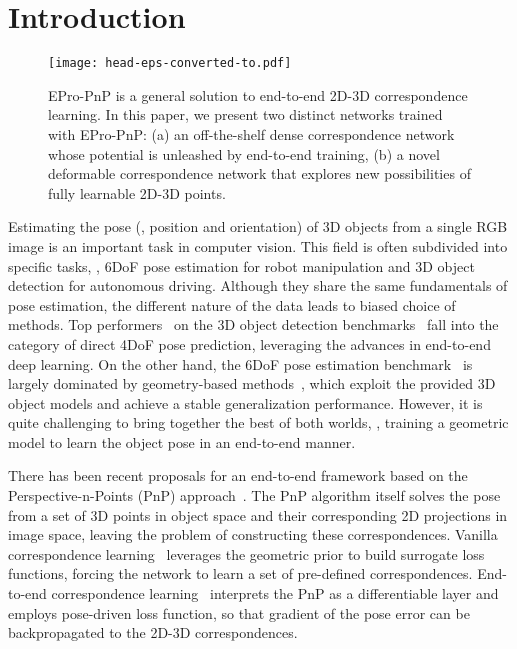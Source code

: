 \documentclass[10pt,twocolumn,letterpaper]{article}
\begin{document}
\section{Introduction}

\begin{figure}[t]
\begin{center}
  \texttt{[image: head-eps-converted-to.pdf]}
\end{center}
\vspace{-0.5ex}
\caption{EPro-PnP is a general solution to end-to-end 2D-3D correspondence learning. In this paper, we present two distinct networks trained with EPro-PnP: (a) an off-the-shelf dense correspondence network whose potential is unleashed by end-to-end training, (b) a novel deformable correspondence network that explores new possibilities of fully learnable 2D-3D points.}
\label{fig:header}
\end{figure}

Estimating the pose (\ie, position and orientation) of 3D objects from a single RGB image is an important task in computer vision.
This field is often subdivided into specific tasks, \eg, 6DoF pose estimation for robot manipulation and 3D object detection for autonomous driving. Although they share the same fundamentals of pose estimation, the different nature of the data leads to biased choice of methods. Top performers~\cite{pgd, dd3d, detr3d} on the 3D object detection benchmarks~\cite{nuscenes,kitti} fall into the category of direct 4DoF pose prediction, leveraging the advances in end-to-end deep learning. On the other hand, the 6DoF pose estimation benchmark~\cite{linemod} is largely dominated by geometry-based methods~\cite{repose, DPOD}, which exploit the provided 3D object models and achieve a stable generalization performance. However, it is quite challenging to bring together the best of both worlds, \ie, training a geometric model to learn the object pose in an end-to-end manner.

There has been recent proposals for an end-to-end framework based on the Perspective-n-Points (PnP) approach~\cite{dsac, dsac++, blindpnp, BPnP}. The PnP algorithm itself solves the pose from a set of 3D points in object space and their corresponding 2D projections in image space, leaving the problem of constructing these correspondences.
Vanilla correspondence learning~\cite{pvnet, hybridpose, bb8, NOCS, pix2pose, DPOD, CDPN, RTM3D, deep-manta, pix2pose} leverages the geometric prior to build surrogate loss functions, forcing the network to learn a set of pre-defined correspondences. End-to-end correspondence learning~\cite{dsac, dsac++, blindpnp, BPnP} interprets the PnP as a differentiable layer and employs pose-driven loss function, so that gradient of the pose error can be backpropagated to the 2D-3D correspondences.
\end{document}
